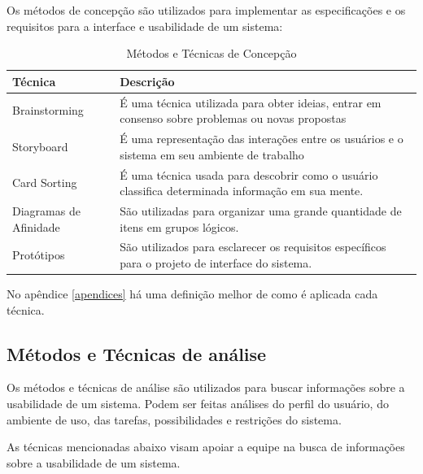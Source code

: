 Os métodos de concepção são utilizados para implementar as especificações e os requisitos para a interface e usabilidade de um sistema:

\begin{table}[h]
\centering
\begin{tabular}{|p{4cm}|p{8cm}|}
\hline 
Técnica & Descrição \\ 
\hline 
Brainstorming & É uma técnica utilizada para obter ideias, entrar em consenso sobre problemas ou novas propostas \\ 
\hline 
Storyboard & É uma representação das interações entre os usuários e o sistema em seu ambiente de trabalho \\ 
\hline 
Card Sorting & É uma técnica usada para descobrir como o usuário classifica determinada informação em sua mente. \\ 
\hline 
Diagramas de Afinidade & São utilizadas para organizar uma grande quantidade de itens em grupos lógicos. \\ 
\hline 
Protótipos & São utilizados para esclarecer os requisitos específicos para o projeto de interface do sistema. \\ 
\hline 
\end{tabular}
\caption{Métodos e Técnicas de Concepção}
\end{table}


No apêndice \ref{apendices} há uma definição melhor de como é aplicada cada técnica.


\subsection{Métodos e Técnicas de análise}

Os métodos e técnicas de análise são utilizados para buscar informações sobre a usabilidade de um sistema. Podem ser feitas análises do perfil do usuário, do ambiente de uso, das tarefas, possibilidades e restrições do sistema.

As técnicas mencionadas abaixo visam apoiar a equipe na busca de informações sobre a usabilidade de um sistema. 

